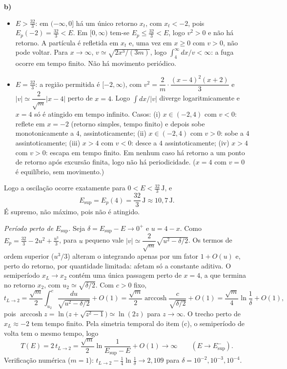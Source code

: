 \documentclass{article}%
\begin{document}
\textbf{b)}
\begin{itemize}
\item $E>\tfrac{32}{3}$: em $(-\infty,0]$ há um único retorno $x_t$, com $x_t<-2$, pois $E_p(-2)=\tfrac{32}{3}<E$. Em $[0,\infty)$ tem-se $E_p\le\tfrac{32}{3}<E$, logo $v^{2}>0$ e não há retorno. A partícula é refletida em $x_t$ e, uma vez em $x\ge 0$ com $v>0$, não pode voltar. Para $x\to\infty$, $v\simeq\sqrt{2x^{3}/(3m)}$, logo $\int_4^\infty dx/v<\infty$: a fuga ocorre em tempo finito. Não há movimento periódico.
\item $E=\tfrac{32}{3}$: a região permitida é $[-2,\infty)$, com $v^{2}=\dfrac{2}{m}\cdot\dfrac{(x-4)^{2}(x+2)}{3}$ e $|v|\simeq\dfrac{2}{\sqrt{m}}|x-4|$ perto de $x=4$. Logo $\int dx/|v|$ diverge logaritmicamente e $x=4$ só é atingido em tempo infinito. Casos: (i) $x\in(-2,4)$ com $v<0$: reflete em $x=-2$ (retorno simples, tempo finito) e depois sobe monotonicamente a $4$, assintoticamente; (ii) $x\in(-2,4)$ com $v>0$: sobe a $4$ assintoticamente; (iii) $x>4$ com $v<0$: desce a $4$ assintoticamente; (iv) $x>4$ com $v>0$: escapa em tempo finito. Em nenhum caso há retorno a um ponto de retorno após excursão finita, logo não há periodicidade. ($x=4$ com $v=0$ é equilíbrio, sem movimento.)
\end{itemize}
Logo a oscilação ocorre exatamente para $0<E<\tfrac{32}{3}\,\mathrm{J}$, e
\[
E_{\text{sup}}=E_p(4)=\frac{32}{3}\,\mathrm{J}\approx 10{,}7\,\mathrm{J}.
\]
É supremo, não máximo, pois não é atingido.

\textit{Período perto de $E_{\text{sup}}$.} Seja $\delta=E_{\text{sup}}-E\to 0^{+}$ e $u=4-x$. Como $E_p=\tfrac{32}{3}-2u^{2}+\tfrac{u^{3}}{3}$, para $u$ pequeno vale $|v|\simeq\dfrac{2}{\sqrt{m}}\sqrt{u^{2}-\delta/2}$. Os termos de ordem superior ($u^{3}/3$) alteram o integrando apenas por um fator $1+O(u)$ e, perto do retorno, por quantidade limitada: afetam só a constante aditiva. O semiperíodo $x_L\to x_2$ contém uma única passagem perto de $x=4$, a que termina no retorno $x_2$, com $u_2\simeq\sqrt{\delta/2}$. Com $c>0$ fixo,
\[
t_{L\to 2}=\frac{\sqrt{m}}{2}\int_{u_2}^{c}\frac{du}{\sqrt{u^{2}-\delta/2}}+O(1)=\frac{\sqrt{m}}{2}\operatorname{arccosh}\frac{c}{\sqrt{\delta/2}}+O(1)=\frac{\sqrt{m}}{4}\ln\frac{1}{\delta}+O(1),
\]
pois $\operatorname{arccosh}z=\ln\bigl(z+\sqrt{z^{2}-1}\bigr)\simeq\ln(2z)$ para $z\to\infty$. O trecho perto de $x_L\approx -2$ tem tempo finito. Pela simetria temporal do item (c), o semiperíodo de volta tem o mesmo tempo, logo
\[
T(E)=2\,t_{L\to 2}=\frac{\sqrt{m}}{2}\ln\frac{1}{E_{\text{sup}}-E}+O(1)\longrightarrow\infty\qquad (E\to E_{\text{sup}}^{-}).
\]
Verificação numérica ($m=1$): $t_{L\to 2}-\tfrac14\ln\tfrac1\delta\to 2{,}109$ para $\delta=10^{-2},10^{-3},10^{-4}$.
\end{document}
